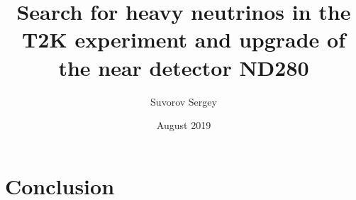 \documentclass[12pt,a4paper]{memoir}
\title{Search for heavy neutrinos in the T2K experiment and upgrade of the near detector ND280}
\author{Suvorov Sergey}
\date{August 2019}
\begin{document}
\maketitle
\clearpage
\tableofcontents*

\linenumbers






\part{Conclusion}

\printbibliography
\end{document}
